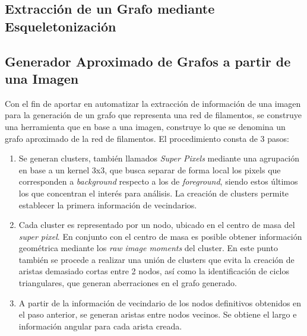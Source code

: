 

\subsection{Extracci\'on de un Grafo mediante Esqueletonizaci\'on}


\subsection{Generador Aproximado de Grafos a partir de una Imagen}

Con el fin de aportar en automatizar la extracci\'on de informaci\'on de una imagen para la generaci\'on de un grafo que representa una red de filamentos, se construye una herramienta que en base a una imagen, construye lo que se denomina un grafo aproximado de la red de filamentos. El procedimiento consta de 3 pasos:

\begin{enumerate}
    \item Se generan clusters, tambi\'en llamados {\it Super Pixels} mediante una agrupaci\'on en base a un kernel 3x3, que busca separar de forma local los pixels que corresponden a {\it background} respecto a los de {\it foreground}, siendo estos \'ultimos los que concentran el inter\'es para an\'alisis. La creaci\'on de clusters permite establecer la primera informaci\'on de vecindarios.
    \item Cada cluster es representado por un nodo, ubicado en el centro de masa del {\it super pixel}. En conjunto con el centro de masa es posible obtener informaci\'on geom\'etrica mediante los {\it raw image moments}\cite{chaumette2004image} del cluster. En este punto tambi\'en se procede a realizar una uni\'on de clusters que evita la creaci\'on de aristas demasiado cortas entre 2 nodos, as\'i como la identificaci\'on de ciclos triangulares, que generan aberraciones en el grafo generado.
    \item A partir de la informaci\'on de vecindario de los nodos definitivos obtenidos en el paso anterior, se generan aristas entre nodos vecinos. Se obtiene el largo e  informaci\'on angular para cada arista creada. %
\end{enumerate}

